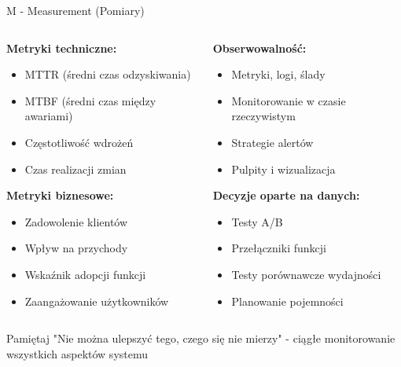 \documentclass[10pt, aspectratio=169]{beamer}
\begin{document}
\begin{frame}{M - Measurement (Pomiary)}
\begin{columns}[T]
\begin{column}{0.5\textwidth}
\textbf{Metryki techniczne:}
\begin{itemize}
\item MTTR (średni czas odzyskiwania)
\item MTBF (średni czas między awariami)
\item Częstotliwość wdrożeń
\item Czas realizacji zmian
\end{itemize}

\textbf{Metryki biznesowe:}
\begin{itemize}
\item Zadowolenie klientów
\item Wpływ na przychody
\item Wskaźnik adopcji funkcji
\item Zaangażowanie użytkowników
\end{itemize}
\end{column}
\begin{column}{0.5\textwidth}
\textbf{Obserwowalność:}
\begin{itemize}
\item Metryki, logi, ślady
\item Monitorowanie w czasie rzeczywistym
\item Strategie alertów
\item Pulpity i wizualizacja
\end{itemize}

\textbf{Decyzje oparte na danych:}
\begin{itemize}
\item Testy A/B
\item Przełączniki funkcji
\item Testy porównawcze wydajności
\item Planowanie pojemności
\end{itemize}
\end{column}
\end{columns}

\begin{alertblock}{Pamiętaj}
"Nie można ulepszyć tego, czego się nie mierzy" - ciągłe monitorowanie wszystkich aspektów systemu
\end{alertblock}
\end{frame}
\end{document}
